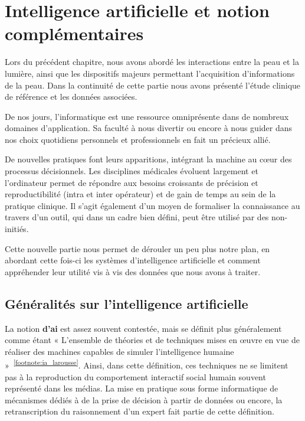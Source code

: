 \chapter{Intelligence artificielle et notion complémentaires}
\label{chap:chapter_3}
\chapterintro
Lors du précédent chapitre, nous avons abordé les interactions entre la peau et la lumière, ainsi que les dispositifs majeurs permettant l'acquisition d'informations de la peau. Dans la continuité de cette partie nous avons présenté l'étude clinique de référence et les données associées.\par

De nos jours, l’informatique est une ressource omniprésente dans de nombreux domaines d’application. Sa faculté à nous divertir ou encore à nous guider dans nos choix quotidiens personnels et professionnels en fait un précieux allié.\par 

De nouvelles pratiques font leurs apparitions, intégrant la machine au cœur des processus décisionnels. Les disciplines médicales évoluent largement et l’ordinateur permet de répondre aux besoins croissants de précision et reproductibilité (intra et inter opérateur) et de gain de temps au sein de la pratique clinique. Il s’agit également d’un moyen de formaliser la connaissance au travers d’un outil, qui dans un cadre bien défini, peut être utilisé par des non-initiés.\par

Cette nouvelle partie nous permet de dérouler un peu plus notre plan, en abordant cette fois-ci les systèmes d'intelligence artificielle et comment appréhender leur utilité vis à vis des données que nous avons à traiter.\par
\newpage

\section{Généralités sur l'intelligence artificielle}
\label{sec:artificial_intelligence}
La notion \textbf{d’\gls{ai}} est assez souvent contestée, mais se définit plus généralement comme étant « L’ensemble de théories et de techniques mises en œuvre en vue de réaliser des machines capables de simuler l'intelligence humaine »~\textsuperscript{\ref{footnote:ia_larousse}}. Ainsi, dans cette définition, ces techniques ne se limitent pas à la reproduction du comportement interactif social humain souvent représenté dans les médias. La mise en pratique sous forme informatique de mécanismes dédiés à de la prise de décision à partir de données ou encore, la retranscription du raisonnement d'un expert fait partie de cette définition.\par


